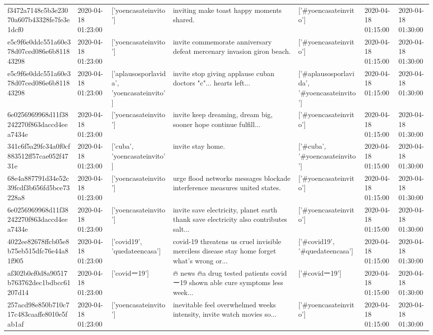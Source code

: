 \begin{tabular}{lllllll}
f3472a7148c5b3e23070a607b43328fe7fe3e1dcf0 & 2020-04-18 01:23:00 & ['yoencasateinvito'] & inviting make toast happy moments shared. & ['#yoencasateinvito'] & 2020-04-18 01:15:00 & 2020-04-18 01:30:00 \\
e5c9f6e0ddc551a60e378d07ced086e6b811843298 & 2020-04-18 01:23:00 & ['yoencasateinvito'] & invite commemorate anniversary defeat mercenary invasion giron beach. & ['#yoencasateinvito'] & 2020-04-18 01:15:00 & 2020-04-18 01:30:00 \\
e5c9f6e0ddc551a60e378d07ced086e6b811843298 & 2020-04-18 01:23:00 & ['aplausosporlavida', 'yoencasateinvito'] & invite stop giving applause cuban doctors "c"... hearts left... & ['#aplausosporlavida', '#yoencasateinvito'] & 2020-04-18 01:15:00 & 2020-04-18 01:30:00 \\
6e0256969968d11f38242270f863daccd4eea7434e & 2020-04-18 01:23:00 & ['yoencasateinvito'] & invite keep dreaming, dream big, sooner hope continue fulfill... & ['#yoencasateinvito'] & 2020-04-18 01:15:00 & 2020-04-18 01:30:00 \\
341c6f5a29fc34a0f0cf883512ff57cae052f4731e & 2020-04-18 01:23:00 & ['cuba', 'yoencasateinvito'] & invite stay home. & ['#cuba', '#yoencasateinvito'] & 2020-04-18 01:15:00 & 2020-04-18 01:30:00 \\
68e4a887791d34e52c39fcdf3b656fd5bce73228a8 & 2020-04-18 01:23:00 & ['yoencasateinvito'] & urge flood networks messages blockade interference measures united states. & ['#yoencasateinvito'] & 2020-04-18 01:15:00 & 2020-04-18 01:30:00 \\
6e0256969968d11f38242270f863daccd4eea7434e & 2020-04-18 01:23:00 & ['yoencasateinvito'] & invite save electricity, planet earth thank save electricity also contributes salt... & ['#yoencasateinvito'] & 2020-04-18 01:15:00 & 2020-04-18 01:30:00 \\
4022ee82678ffcb05e8b75eb515dfc76e44a81f905 & 2020-04-18 01:23:00 & ['covid19', 'quedateencasa'] & covid-19 threatens us cruel invisible merciless disease stay home forget what's wrong or... & ['#covid19', '#quedateencasa'] & 2020-04-18 01:15:00 & 2020-04-18 01:30:00 \\
af302b0ef0d8a90517b763762dec1bdbcc61207d14 & 2020-04-18 01:23:00 & ['covidー19'] & 🔥 news 🔥a drug tested patients covidー19 shown able cure symptoms less week... & ['#covidー19'] & 2020-04-18 01:15:00 & 2020-04-18 01:30:00 \\
257acd98e850b710c717c483caaffe8010e5fab1af & 2020-04-18 01:23:00 & ['yoencasateinvito'] & inevitable feel overwhelmed weeks intensity, invite watch movies so... & ['#yoencasateinvito'] & 2020-04-18 01:15:00 & 2020-04-18 01:30:00 \\

\end{tabular}
